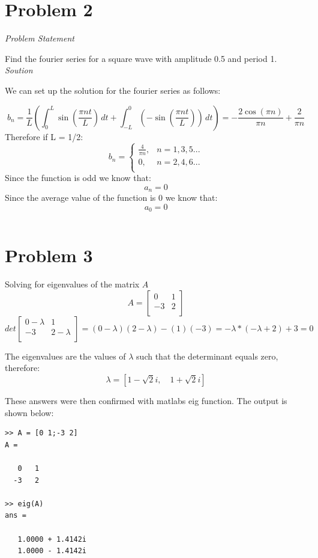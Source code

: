 \documentclass{article}
\begin{document}
\section{Problem 2}


\emph{Problem Statement}

Find the fourier series for a square wave with amplitude 0.5 and period 1.
\emph{Soution}

We can set up the solution for the fourier series as follows:

\[
   b_n = \frac{1}{L}(\int_{0}^{L} \sin{\left (\frac{\pi n t}{L} \right )}\, dt 
   +\int_{-L}^{0} \left(- \sin{\left (\frac{\pi n t}{L} \right )}\right)\, dt)
   = - \frac{2  \cos{\left ( \pi n \right )}}{\pi n} + \frac{2 }{\pi n}
\]
Therefore if L = 1/2:
\[
b_n =
\begin{cases}
\frac{4}{\pi n}, &  n = 1,3,5... \\
0, & n= 2,4,6...\\
\end{cases}
\]
Since the function is odd we know that:
\[ 
a_n = 0 
\]
Since the average value of the function is 0 we know that:
\[
a_0 = 0
\]

\begin{verbatim}
\end{verbatim}

\section{Problem 3}

Solving for eigenvalues of the matrix $A$ 
\[
A = \begin{bmatrix}0&1\\[0.3em]
-3&2\\[0.3em]
\end{bmatrix}
\]
\[
det \begin{bmatrix}0 - \lambda&1\\[0.3em]
-3&2-\lambda\\[0.3em]
\end{bmatrix}
= (0 - \lambda)(2 - \lambda) - (1)(-3) = -\lambda*(-\lambda + 2) + 3 = 0
\]

The eigenvalues are the values of $\lambda$ such that the determinant equals zero, therefore:
\[
\lambda = \left [ 1 - \sqrt{2} i, \quad 1 + \sqrt{2} i\right ]
\]

These answers were then confirmed with matlabs eig function. The output is shown below:

\begin{verbatim}
>> A = [0 1;-3 2]
A =

   0   1
  -3   2

>> eig(A)
ans =

   1.0000 + 1.4142i
   1.0000 - 1.4142i

\end{verbatim}
\end{document}
